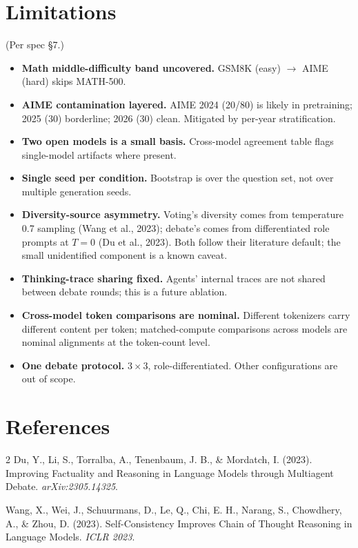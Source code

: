 \documentclass[11pt]{article}
\begin{document}
\section{Limitations}
\label{sec:limitations}

(Per spec §7.)
\begin{itemize}
  \item \textbf{Math middle-difficulty band uncovered.} GSM8K (easy)
        $\to$ AIME (hard) skips MATH-500.
  \item \textbf{AIME contamination layered.} AIME 2024 (20/80) is
        likely in pretraining; 2025 (30) borderline; 2026 (30) clean.
        Mitigated by per-year stratification.
  \item \textbf{Two open models is a small basis.} Cross-model
        agreement table flags single-model artifacts where present.
  \item \textbf{Single seed per condition.} Bootstrap is over the
        question set, not over multiple generation seeds.
  \item \textbf{Diversity-source asymmetry.} Voting's diversity comes
        from temperature 0.7 sampling (Wang et al., 2023); debate's
        comes from differentiated role prompts at $T = 0$ (Du et al.,
        2023). Both follow their literature default; the small
        unidentified component is a known caveat.
  \item \textbf{Thinking-trace sharing fixed.} Agents' internal
        traces are not shared between debate rounds; this is a
        future ablation.
  \item \textbf{Cross-model token comparisons are nominal.} Different
        tokenizers carry different content per token; matched-compute
        comparisons across models are nominal alignments at the
        token-count level.
  \item \textbf{One debate protocol.} $3 \times 3$, role-differentiated.
        Other configurations are out of scope.
\end{itemize}

\section*{References}

%
%

\begin{thebibliography}{2}
 Du, Y., Li, S., Torralba, A., Tenenbaum, J. B.,
  \& Mordatch, I. (2023). Improving Factuality and Reasoning in Language
  Models through Multiagent Debate. \emph{arXiv:2305.14325}.

 Wang, X., Wei, J., Schuurmans, D.,
  Le, Q., Chi, E. H., Narang, S., Chowdhery, A., \& Zhou, D. (2023).
  Self-Consistency Improves Chain of Thought Reasoning in Language
  Models. \emph{ICLR 2023}.
\end{thebibliography}
\end{document}
